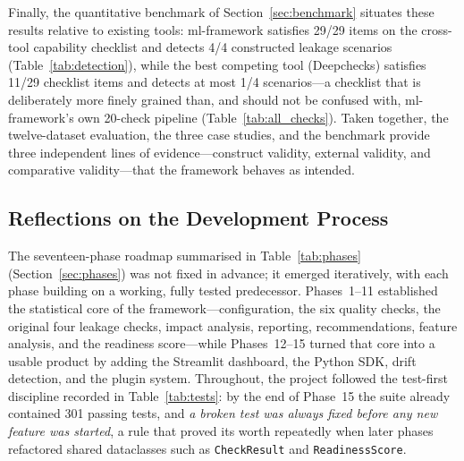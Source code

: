 \documentclass[12pt,a4paper]{report}
\begin{document}
Finally, the quantitative benchmark of Section~\ref{sec:benchmark} situates these results
relative to existing tools: ml-framework satisfies 29/29 items on the cross-tool capability
checklist and detects 4/4 constructed leakage scenarios (Table~\ref{tab:detection}), while
the best competing tool (Deepchecks) satisfies 11/29 checklist items and detects at most 1/4
scenarios---a checklist that is deliberately more finely grained than, and should not be
confused with, ml-framework's own 20-check pipeline (Table~\ref{tab:all_checks}).  Taken
together, the twelve-dataset evaluation, the three case studies, and the benchmark provide
three independent lines of evidence---construct validity, external validity, and
comparative validity---that the framework behaves as intended.

\subsection{Reflections on the Development Process}

The seventeen-phase roadmap summarised in Table~\ref{tab:phases} (Section~\ref{sec:phases})
was not fixed in advance; it emerged iteratively, with each phase building on a working,
fully tested predecessor.  Phases~1--11 established the statistical core of the
framework---configuration, the six quality checks, the original four leakage checks, impact
analysis, reporting, recommendations, feature analysis, and the readiness score---while
Phases~12--15 turned that core into a usable product by adding the Streamlit dashboard, the
Python SDK, drift detection, and the plugin system.  Throughout, the project followed the
test-first discipline recorded in Table~\ref{tab:tests}: by the end of Phase~15 the suite
already contained 301 passing tests, and \emph{a broken test was always fixed before any new
feature was started}, a rule that proved its worth repeatedly when later phases refactored
shared dataclasses such as \texttt{CheckResult} and \texttt{ReadinessScore}.
\end{document}
